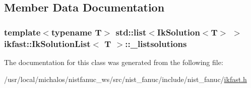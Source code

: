 \subsection{Member Data Documentation}
\hypertarget{classikfast_1_1IkSolutionList_a141004e6be454a5b9ab537d102c7f405}{
\subsubsection[{\-\_\-listsolutions}]{\setlength{\rightskip}{0pt plus 5cm}template$<$typename T$>$ std\-::list$<${\bf Ik\-Solution}$<$T$>$ $>$ {\bf ikfast\-::\-Ik\-Solution\-List}$<$ T $>$\-::\-\_\-listsolutions\hspace{0.3cm}{\ttfamily [protected]}}}\label{classikfast_1_1IkSolutionList_a141004e6be454a5b9ab537d102c7f405}


The documentation for this class was generated from the following file\-:\begin{DoxyCompactItemize}
\item 
/usr/local/michalos/nistfanuc\-\_\-ws/src/nist\-\_\-fanuc/include/nist\-\_\-fanuc/\hyperlink{ikfast_8h}{ikfast.\-h}\end{DoxyCompactItemize}
